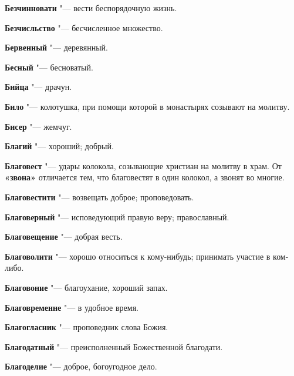 \begin{mymulticols}{2}
\noindent\textbf{Безчинновати} "--- вести беспорядочную жизнь. 




\noindent\textbf{Безчисльство} "--- бесчисленное множество. 




\noindent\textbf{Бервенный} "--- деревянный. 




\noindent\textbf{Бесный} "--- бесноватый. 




\noindent\textbf{Бийца} "--- драчун. 




\noindent\textbf{Било} "--- колотушка, при помощи которой в монастырях созывают на молитву. 




\noindent\textbf{Бисер} "--- жемчуг. 




\noindent\textbf{Благий} "--- хороший; добрый. 




\noindent\textbf{Благовест} "--- удары колокола, созывающие христиан на молитву в храм. От \textbf{«звона»} отличается тем, что благовестят в один колокол, а звонят во многие. 



\noindent\textbf{Благовестити} "--- возвещать доброе; проповедовать. 




\noindent\textbf{Благоверный} "--- исповедующий правую веру; православный. 




\noindent\textbf{Благовещение} "--- добрая весть. 




\noindent\textbf{Благоволити} "--- хорошо относиться к кому-нибудь; принимать участие в ком-либо. 




\noindent\textbf{Благовоние} "--- благоухание, хороший запах. 




\noindent\textbf{Благовременне} "--- в удобное время. 




\noindent\textbf{Благогласник} "--- проповедник слова Божия. 




\noindent\textbf{Благодатный} "--- преисполненный Божественной благодати. 




\noindent\textbf{Благоделие} "--- доброе, богоугодное дело. 





\end{mymulticols}
